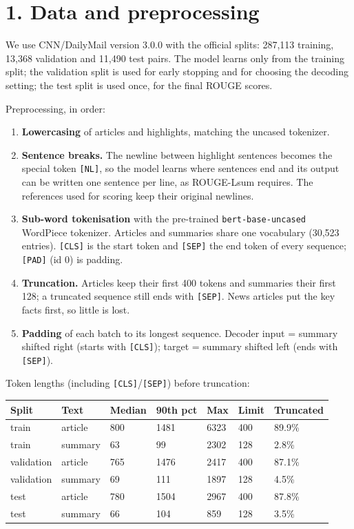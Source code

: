 \documentclass[10pt,a4paper]{article}
\providecommand{\tightlist}{\setlength{\itemsep}{0pt}\setlength{\parskip}{0pt}}
\begin{document}
\hypertarget{data-and-preprocessing}{%
\section{1. Data and preprocessing}\label{data-and-preprocessing}}

We use CNN/DailyMail version 3.0.0 with the official splits: 287,113 training, 13,368 validation and 11,490 test pairs. The model learns only from the training split; the validation split is used for early stopping and for choosing the decoding setting; the test split is used once, for the final ROUGE scores.

Preprocessing, in order:

\begin{enumerate}
\def\labelenumi{\arabic{enumi}.}
\tightlist
\item
  \textbf{Lowercasing} of articles and highlights, matching the uncased tokenizer.
\item
  \textbf{Sentence breaks.} The newline between highlight sentences becomes the special token \texttt{{[}NL{]}}, so the model learns where sentences end and its output can be written one sentence per line, as ROUGE-Lsum requires. The references used for scoring keep their original newlines.
\item
  \textbf{Sub-word tokenisation} with the pre-trained \texttt{bert-base-uncased} WordPiece tokenizer. Articles and summaries share one vocabulary (30,523 entries). \texttt{{[}CLS{]}} is the start token and \texttt{{[}SEP{]}} the end token of every sequence; \texttt{{[}PAD{]}} (id 0) is padding.
\item
  \textbf{Truncation.} Articles keep their first 400 tokens and summaries their first 128; a truncated sequence still ends with \texttt{{[}SEP{]}}. News articles put the key facts first, so little is lost.
\item
  \textbf{Padding} of each batch to its longest sequence. Decoder input = summary shifted right (starts with \texttt{{[}CLS{]}}); target = summary shifted left (ends with \texttt{{[}SEP{]}}).
\end{enumerate}

Token lengths (including \texttt{{[}CLS{]}}/\texttt{{[}SEP{]}}) before truncation:

\begin{longtable}[]{@{}lllllll@{}}
\toprule\noalign{}
Split & Text & Median & 90th pct & Max & Limit & Truncated \\
\midrule\noalign{}
\endhead
\bottomrule\noalign{}
\endlastfoot
train & article & 800 & 1481 & 6323 & 400 & 89.9\% \\
train & summary & 63 & 99 & 2302 & 128 & 2.8\% \\
validation & article & 765 & 1476 & 2417 & 400 & 87.1\% \\
validation & summary & 69 & 111 & 1897 & 128 & 4.5\% \\
test & article & 780 & 1504 & 2967 & 400 & 87.8\% \\
test & summary & 66 & 104 & 859 & 128 & 3.5\% \\
\end{longtable}
\end{document}
